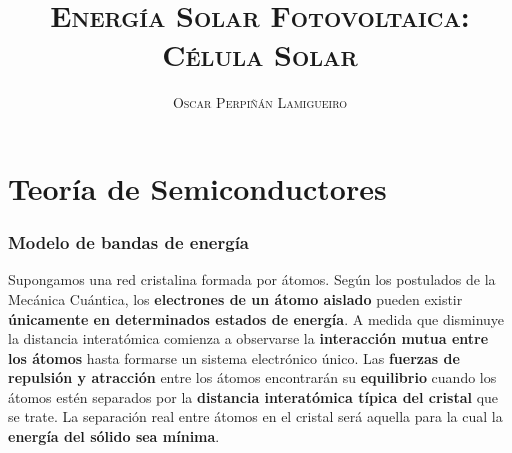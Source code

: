 \documentclass[xcolor=dvipsnames]{beamer}
\begin{document}
\title{\textsc{Energía Solar Fotovoltaica:}\\
\textsc{Célula Solar}}


\author{\textsc{Oscar Perpiñán Lamigueiro}}
\date{}

\begin{frame}[plain]

\titlepage

\end{frame}

%

%


\section{Teoría de Semiconductores}


\begin{frame}
  \frametitle{Modelo de bandas de energía}

  Supongamos una red cristalina formada por átomos. Según los
  postulados de la Mecánica Cuántica, los \textbf{electrones de un
    átomo aislado} pueden existir \textbf{únicamente en determinados
    estados de energía}.  A medida que disminuye la distancia
  interatómica comienza a observarse la \textbf{interacción mutua
    entre los átomos} hasta formarse un sistema electrónico único. Las
  \textbf{fuerzas de repulsión y atracción} entre los átomos
  encontrarán su \textbf{equilibrio} cuando los átomos estén separados
  por la \textbf{distancia interatómica típica del cristal} que se
  trate. La separación real entre átomos en el cristal será aquella
  para la cual la \textbf{energía del sólido sea mínima}.


\end{frame}
\end{document}
